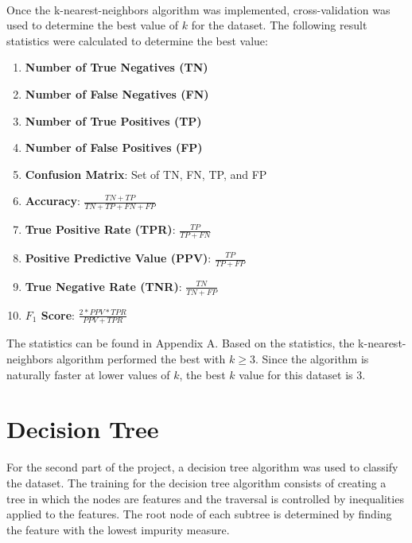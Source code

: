 \documentclass[12pt]{article}
\begin{document}
    \paragraph{}
    Once the k-nearest-neighbors algorithm was implemented, cross-validation was used to determine the best value of $k$ for the dataset. The following result statistics were calculated to determine the best value:
    \begin{enumerate}
    	\item \textbf{Number of True Negatives (TN)}
    	\item \textbf{Number of False Negatives (FN)}
    	\item \textbf{Number of True Positives (TP)}
    	\item \textbf{Number of False Positives (FP)}
    	\item \textbf{Confusion Matrix}: Set of TN, FN, TP, and FP
    	\item \textbf{Accuracy}: $\frac{TN + TP}{TN + TP + FN + FP}$
    	\item \textbf{True Positive Rate (TPR)}: $\frac{TP}{TP + FN}$
    	\item \textbf{Positive Predictive Value (PPV)}: $\frac{TP}{TP + FP}$
    	\item \textbf{True Negative Rate (TNR)}: $\frac{TN}{TN + FP}$
    	\item \textbf{$F_1$ Score}: $\frac{2* PPV * TPR}{PPV + TPR}$ 
    \end{enumerate}
    The statistics can be found in Appendix A. Based on the statistics, the k-nearest-neighbors algorithm performed the best with $k \ge 3$. Since the algorithm is naturally faster at lower values of $k$, the best $k$ value for this dataset is 3.
    \section{Decision Tree}
    For the second part of the project, a decision tree algorithm was used to classify the dataset. The training for the decision tree algorithm consists of creating a tree in which the nodes are features and the traversal is controlled by inequalities applied to the features. The root node of each subtree is determined by finding the feature with the lowest impurity measure.
\end{document}
